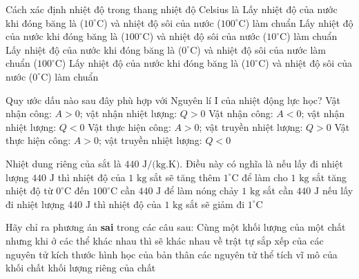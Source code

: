 \begin{ex}	Cách xác định nhiệt độ trong thang nhiệt độ Celsius là
	\choice
	{Lấy nhiệt độ của nước khi đóng băng là ($10^\circ\text{C}$) và nhiệt độ sôi của nước ($100^\circ\text{C}$) làm chuẩn}
	{Lấy nhiệt độ của nước khi đóng băng là ($100^\circ\text{C}$) và nhiệt độ sôi của nước ($10^\circ\text{C}$) làm chuẩn}
	{\True Lấy nhiệt độ của nước khi đóng băng là ($0^\circ\text{C}$) và nhiệt độ sôi của nước làm chuẩn ($100^\circ\text{C}$)}
	{Lấy nhiệt độ của nước khi đóng băng là ($10^\circ\text{C}$) và nhiệt độ sôi của nước ($0^\circ\text{C}$) làm chuẩn}
\end{ex}

\begin{ex}	Quy ước dấu nào sau đây phù hợp với Nguyên lí I của nhiệt động lực học?
	\choice
	{\True Vật nhận công: $A>0$; vật nhận nhiệt lượng: $Q>0$}
	{Vật nhận công: $A<0$; vật nhận nhiệt lượng: $Q<0$}
	{Vật thực hiện công: $A>0$; vật truyền nhiệt lượng: $Q>0$}
	{Vật thực hiện công: $A>0$; vật truyền nhiệt lượng: $Q<0$}
\end{ex}

\begin{ex}	Nhiệt dung riêng của sắt là $440\text{ J/(kg.K)}$. Điều này có nghĩa là
	\choice
	{nếu lấy đi nhiệt lượng $440\text{ J}$ thì nhiệt độ của $1\text{ kg}$ sắt sẽ tăng thêm $1^\circ\text{C}$}
	{để làm cho $1\text{ kg}$ sắt tăng nhiệt độ từ $0^\circ\text{C}$ đến $100^\circ\text{C}$ cần $440\text{ J}$}
	{để làm nóng chảy $1\text{ kg}$ sắt cần $440\text{ J}$}
	{\True nếu lấy đi nhiệt lượng $440\text{ J}$ thì nhiệt độ của $1\text{ kg}$ sắt sẽ giảm đi $1^\circ\text{C}$}
\end{ex}

\begin{ex}	Hãy chỉ ra phương án \textbf{sai} trong các câu sau: Cùng một khối lượng của một chất nhưng khi ở các thể khác nhau thì sẽ khác nhau về
	\choice
	{trật tự sắp xếp của các nguyên tử}
	{\True kích thước hình học của bản thân các nguyên tử}
	{thể tích vĩ mô của khối chất}
	{khối lượng riêng của chất}
\end{ex}

